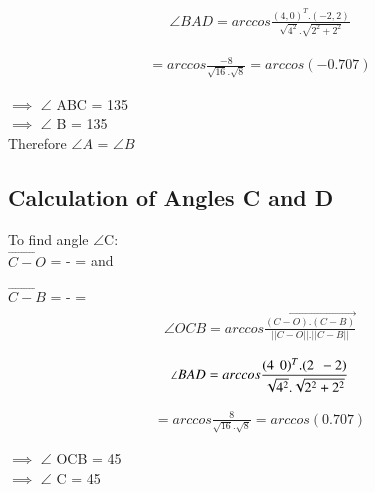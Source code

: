 \documentclass[journal,10pt,twocolumn]{article}
\begin{document}
\begin{flushleft}
\begin{align}
\angle BAD = arccos \frac{(4, 0)^T .(-2, 2)}{\sqrt{4^2}.\sqrt{2^2+2^2} }
\end{align}

\begin{align}
= arccos \frac{-8 } {\sqrt{16}.\sqrt{8}} =arccos (-0.707)
\end{align}

\begin{flushleft}
$\implies$   $\angle$ ABC = 135 \textdegree\\
\vspace{0.3cm}
$\implies$   $\angle$ B = 135 \textdegree
\\
\vspace{0.3cm}
Therefore $\angle A$ = $\angle B$
\end{flushleft}

\subsection{Calculation of Angles C and D}
\vspace{0.25cm}

To find angle $\angle$C:\\
$\vec{C-O}$ =  - 
	= 
and 

$\vec{C-B}$ = -  = 
\\

\begin{align}
\angle OCB = arccos \vec{\frac{(C-O).(C-B)}{||C-O ||. ||C-B||}}
\end{align}

\begin{align}
\angle BAD = arccos \frac{(4 \hspace{0.15cm} 0)^T . (2 \hspace{0.15cm} -2) } {\sqrt{4^2}.\sqrt{2^2+2^2}}
\end{align}

\begin{align}
= arccos \frac{8 } {\sqrt{16}.\sqrt{8}} = arccos (0.707)
\end{align}
\begin{flushleft}
$\implies$   $\angle$ OCB = 45 \textdegree\\
\vspace{0.3cm}
$\implies$   $\angle$ C = 45 \textdegree
\end{flushleft}


\end{flushleft}
\end{document}
